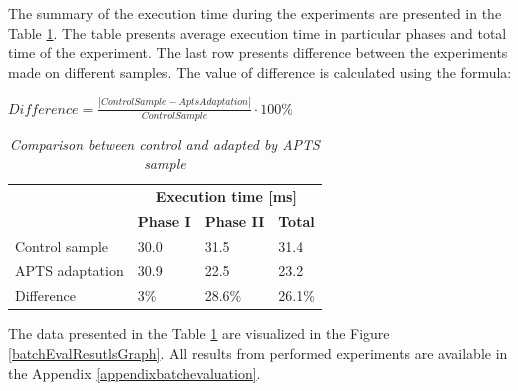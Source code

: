 \documentclass[12pt,a4paper]{article}
\begin{document}
The summary of the execution time during the experiments are presented in the Table \ref{batchCompResutls}. The table presents average execution time in particular phases and total time of the experiment. The last row presents difference between the experiments made on different samples. The value of difference is calculated using the formula: 

\begin{center}
$Difference = \frac{|ControlSample - AptsAdaptation|}{ControlSample}\cdot 100\%$
\end{center}


\begin{table}[!htb]
\caption{\textit{Comparison between control and adapted by APTS sample}} \label{batchCompResutls}
\begin{tabularx}{\textwidth}{p{4cm}|XXX|}

                 &  \multicolumn{3}{c|}{\textbf{Execution time [ms]}} \\
                 &  \textbf{Phase I } & \textbf{Phase II} & \textbf{Total} \\ \hline
Control sample   &  30.0 & 31.5 & 31.4 \\ 
APTS adaptation  &  30.9 & 22.5 & 23.2 \\ \hline
Difference       &  3\% & 28.6\% & 26.1\% \\ 
\end{tabularx}
\end{table}

The data presented in the Table \ref{batchCompResutls} are visualized in the Figure \ref{batchEvalResutlsGraph}.  All results from performed experiments are available in the Appendix \ref{appendixbatchevaluation}. 
\end{document}
